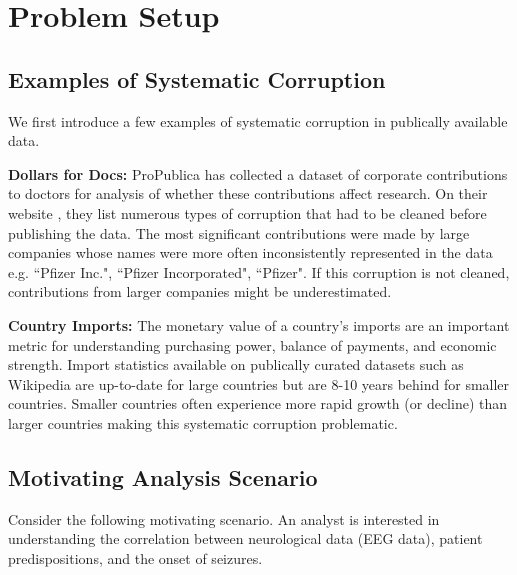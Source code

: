 \section{Problem Setup}\label{background}

\subsection{Examples of Systematic Corruption}
We first introduce a few examples of systematic corruption in publically available data.

\vspace{0.5em}

\noindent\textbf{Dollars for Docs: }
ProPublica has collected a dataset of corporate contributions to doctors for analysis of whether these contributions affect research.
On their website \cite{dollarsfordocs}, they list numerous types of corruption that had to be cleaned before publishing the data.
The most significant contributions were made by large companies whose names were more often inconsistently represented in the data e.g. ``Pfizer Inc.", ``Pfizer Incorporated", ``Pfizer".
If this corruption is not cleaned, contributions from larger companies might be underestimated.

\vspace{0.5em}

\noindent\textbf{Country Imports: }
The monetary value of a country's imports are an important metric for understanding purchasing power, balance of payments, and economic strength. 
Import statistics available on publically curated datasets such as Wikipedia \cite{importstats} are up-to-date for large countries but are 8-10 years behind for smaller countries. 
Smaller countries often experience more rapid growth (or decline) than larger countries making this systematic corruption problematic.

\subsection{Motivating Analysis Scenario}
Consider the following motivating scenario.
An analyst is interested in understanding the correlation between neurological data (EEG data), patient predispositions, and the onset of seizures.

